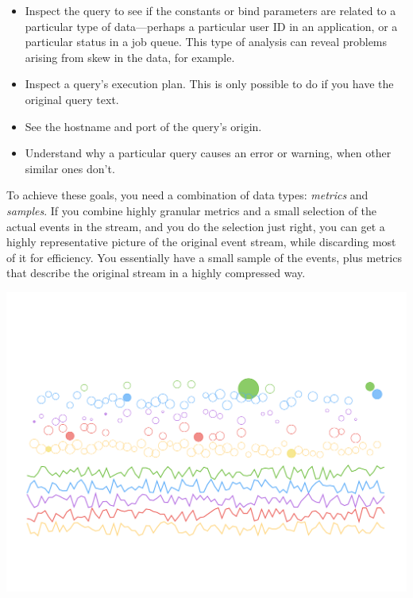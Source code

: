 \documentclass{vivid_layout}
\begin{document}
\begin{itemize}

\item Inspect the query to see if the constants or bind parameters are related to
a particular type of data---perhaps a particular user ID in an application, or a
particular status in a job queue. This type of analysis can reveal problems
arising from skew in the data, for example.

\item Inspect a query's execution plan. This is only possible to do if you have
the original query text.

\item See the hostname and port of the query's origin.

\item Understand why a particular query causes an error or warning, when other
similar ones don't.

\end{itemize}

To achieve these goals, you need a combination of data types: \emph{metrics} and
\emph{samples}. If you combine highly granular metrics and a small selection of
the actual events in the stream, and you do the selection just right, you can
get a highly representative picture of the original event stream, while
discarding most of it for efficiency. You essentially have a small sample of the
events, plus metrics that describe the original stream in a highly compressed
way.

\begin{center}
\includegraphics[width=.85\linewidth]{sketch-sampling/samples-and-metrics}
\end{center}
\end{document}
